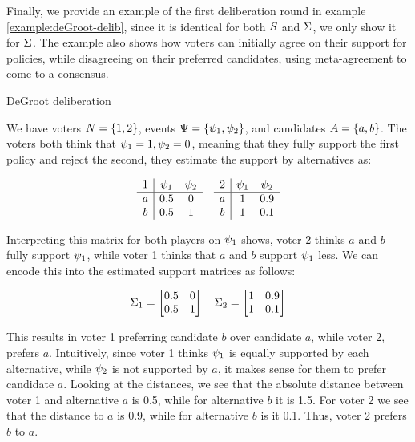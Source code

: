 Finally, we provide an example of the first deliberation round in example
\ref{example:deGroot-delib}, since it is identical for both $S$ and
$\Sigma$, we only show it for $\Sigma$. The example also shows how
voters can initially agree on their support for policies, while disagreeing on
their preferred candidates, using meta-agreement to come to a consensus.

\begin{example}{DeGroot deliberation} {}

	We have voters \(N = \{1,2\}\), events \(\Psi =
	\{\psi_{1}, \psi_{2}\}\), and candidates \(A =
	\{a,b\}\). The voters both think that \(\psi_{1} = 1, \psi_{2} =
	0\), meaning that they fully support the first policy and reject the
	second, they estimate the support by alternatives as:

	\[
		\begin{array}{c|cc}
			1 & \psi_1 & \psi_2 \\ \hline
			a & 0.5       & 0         \\
			b & 0.5       & 1         \\
		\end{array}
		\hspace{1em}
		\begin{array}{c|cc}
			2 & \psi_1 & \psi_2 \\ \hline
			a & 1         & 0.9       \\
			b & 1         & 0.1       \\
		\end{array}
	\]

	Interpreting this matrix for both players on $\psi_1$ shows, voter 2 thinks $a$ and $b$ fully support $\psi_1$, while voter 1 thinks that $a$ and $b$  support $\psi_1$ less. We can encode this into the estimated support matrices as follows:

	\[ \Sigma_1 =\begin{bmatrix} 0.5 & 0 \\
                0.5 & 1 \\\end{bmatrix}\quad
		\Sigma_2 =\begin{bmatrix} 1 & 0.9
                \\ 1 & 0.1 \\\end{bmatrix} \]

	This results in voter 1 preferring candidate $b$ over candidate $a$, while
	voter 2, prefers $a$. Intuitively, since voter 1 thinks $\psi_{1}$ is
	equally supported by each alternative, while $\psi_{2}$ is not supported by
	$a$, it makes sense for them to prefer candidate $a$. Looking at the distances,
	we see that the absolute distance between voter 1 and alternative $a$ is 0.5,
	while for alternative $b$ it is 1.5. For voter 2 we see that the distance to
	$a$ is 0.9, while for alternative $b$ is it 0.1. Thus, voter 2 prefers $b$ to
	$a$.


\end{example}
